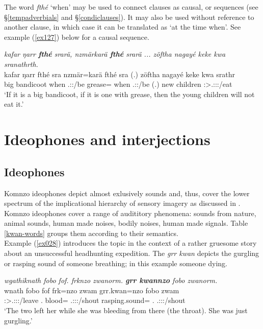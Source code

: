 The word \emph{fthé} `when' may be used to connect clauses as causal,  or  sequences (see \S\ref{tempadverbials} and \S\ref{condiclauses}). It may also be used without reference to another clause, in which case it can be translated as `at the time when'. See example (\ref{ex127}) below for a causal sequence.

\begin{exe}
	\ex \emph{kafar ŋarr \textbf{fthé} srarä, nzmärkarä \textbf{fthé} srarä ... zöftha nagayé keke kwa sranathrth.}\\
	\gll kafar ŋarr fthé sra nzmär=karä fthé sra (.) zöftha nagayé keke kwa srathr\\
	big bandicoot when \Tsg.\Masc:\Irr:\Ipfv/be grease=\Prop{} when \Tsg.\Masc:\Irr:\Ipfv/be (.) new children \Neg{} \Fut{} \Stsg:\Sbj>\Tsg.\Masc:\Obj:\Irr:\Ipfv/eat\\
	\trans `If it is a big bandicoot, if it is one with grease, then the young children will not eat it.'
	\label{ex127}
\end{exe}

\section{Ideophones and interjections} \label{ideophones-and-interjections}

\subsection{Ideophones} \label{ideophonesec}

Komnzo ideophones depict almost exlusively sounds and, thus, cover the lower spectrum of the implicational hierarchy of sensory imagery as discussed in \citep[663]{Dingemanse:2012fc}. Komnzo ideophones cover a range of audititory phenomena: sounds from nature, animal sounds, human made noises, bodily noises, human made signals. Table \ref{kwan-words} groups them according to their semantics.\\

Example (\ref{ex028}) introduces the topic in the context of a rather gruesome story about an unsuccessful headhunting expedition. The  \emph{grr kwan} depicts the gurgling or rasping sound of someone breathing; in this example someone dying.

\begin{exe}
	\ex \emph{wgathiknath fobo fof. frknzo zwanorm. \textbf{grr kwannzo} fobo zwanorm.}\\
	\gll wnath fobo fof frk=nzo zwam grr.kwan=nzo fobo zwam\\
	\Stdu:\Sbj>\Tsg.\F:\Obj:\Pst:\Ipfv/leave \Dist{}.\All{} \Emph{} blood=\Only{} \Tsg.\F:\Sbj:\Pst:\Dur/shout rasping.sound=\Only{} \Dist{}.\All{} \Tsg.\F:\Sbj:\Pst:\Dur/shout\\
	\trans `The two left her while she was bleeding from there (the throat). She was just gurgling.'
	\label{ex028}
\end{exe}

